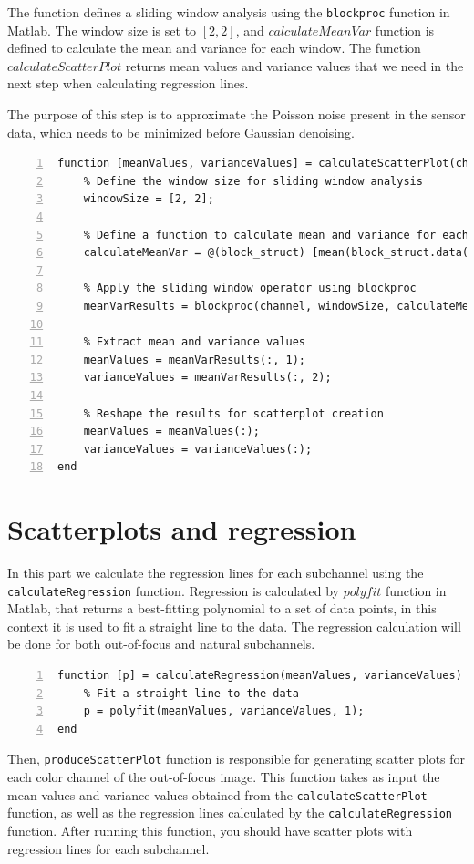 \documentclass[12pt,a4paper,english
]{tunithesis}
\begin{document}
The function defines a sliding window analysis using the \texttt{blockproc} function in Matlab. The window size is set to $[2, 2]$, and $calculateMeanVar$ function is defined to calculate the mean and variance for each window. The function $calculateScatterPlot$ returns mean values and variance values that we need in the next step when calculating regression lines.

The purpose of this step is to approximate the Poisson noise present in the sensor data, which needs to be minimized before Gaussian denoising.

\begin{lstlisting}[style=Matlab-editor, numbers=left, basicstyle=\footnotesize]
% 4. Calculate scatter plots
function [meanValues, varianceValues] = calculateScatterPlot(channel)
    % Define the window size for sliding window analysis
    windowSize = [2, 2];

    % Define a function to calculate mean and variance for each window
    calculateMeanVar = @(block_struct) [mean(block_struct.data(:)), var(block_struct.data(:))];

    % Apply the sliding window operator using blockproc
    meanVarResults = blockproc(channel, windowSize, calculateMeanVar);

    % Extract mean and variance values
    meanValues = meanVarResults(:, 1);
    varianceValues = meanVarResults(:, 2);

    % Reshape the results for scatterplot creation
    meanValues = meanValues(:);
    varianceValues = varianceValues(:);
end
\end{lstlisting}

\section{Scatterplots and regression}
In this part we calculate the regression lines for each subchannel using the \texttt{calculateRegression} function. Regression is calculated by $polyfit$ function in Matlab, that returns a best-fitting polynomial to a set of data points, in this context it is used to fit a straight line to the data. The regression calculation will be done for both out-of-focus and natural subchannels.
\begin{lstlisting}[style=Matlab-editor, numbers=left, basicstyle=\footnotesize]
% 5. Calculate regression lines
function [p] = calculateRegression(meanValues, varianceValues)
    % Fit a straight line to the data
    p = polyfit(meanValues, varianceValues, 1);
end
\end{lstlisting}
Then,  \texttt{produceScatterPlot} function is responsible for generating scatter plots for each color channel of the out-of-focus image. This function takes as input the mean values and variance values obtained from the \texttt{calculateScatterPlot} function, as well as the regression lines calculated by the \texttt{calculateRegression} function. After running this function, you should have scatter plots with regression lines for each subchannel.
\end{document}
